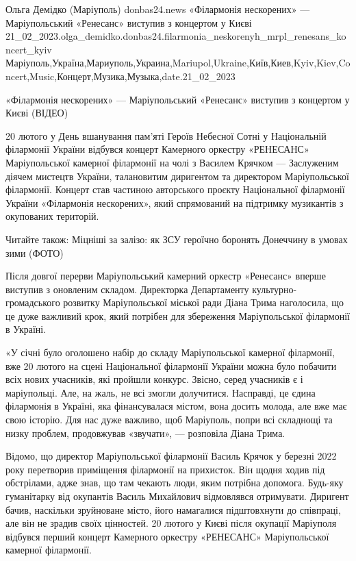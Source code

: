  
 
 
 
 

Ольга Демідко (Маріуполь)
donbas24.news
«Філармонія нескорених» — Маріупольський «Ренесанс» виступив з концертом у Києві
21_02_2023.olga_demidko.donbas24.filarmonia_neskorenyh_mrpl_renesans_koncert_kyiv
Маріуполь,Україна,Мариуполь,Украина,Mariupol,Ukraine,Київ,Киев,Kyiv,Kiev,Concert,Music,Концерт,Музика,Музыка,date.21_02_2023

«Філармонія нескорених» — Маріупольський «Ренесанс» виступив з концертом у Києві (ВІДЕО)

20 лютого у День вшанування пам’яті Героїв Небесної Сотні у Національній
філармонії України відбувся концерт Камерного оркестру «РЕНЕСАНС»
Маріупольської камерної філармонії на чолі з Василем Крячком — Заслуженим
діячем мистецтв України, талановитим диригентом та директором Маріупольської
філармонії. Концерт став частиною авторського проєкту Національної філармонії
України «Філармонія нескорених», який спрямований на підтримку музикантів з
окупованих територій.

Читайте також: Міцніші за залізо: як ЗСУ героїчно боронять Донеччину в умовах
зими (ФОТО)

Після довгої перерви Маріупольський камерний оркестр «Ренесанс» вперше виступив
з оновленим складом. Директорка Департаменту культурно-громадського розвитку
Маріупольської міської ради Діана Трима наголосила, що це дуже важливий крок,
який потрібен для збереження Маріупольської філармонії в Україні.

«У січні було оголошено набір до складу Маріупольської камерної філармонії, вже
20 лютого на сцені Національної філармонії України можна було побачити всіх
нових учасників, які пройшли конкурс. Звісно, серед учасників є і маріупольці.
Але, на жаль, не всі змогли долучитися. Насправді, це єдина філармонія в
Україні, яка фінансувалася містом, вона досить молода, але вже має свою
історію. Для нас дуже важливо, щоб Маріуполь, попри всі складнощі та низку
проблем, продовжував «звучати», — розповіла Діана Трима.

Відомо, що директор Маріупольської філармонії Василь Крячок у березні 2022 року
перетворив приміщення філармонії на прихисток. Він щодня ходив під обстрілами,
адже знав, що там чекають люди, яким потрібна допомога. Будь-яку гуманітарку
від окупантів Василь Михайлович відмовлявся отримувати. Диригент бачив,
наскільки зруйноване місто, його намагалися підштовхнути до співпраці, але він
не зрадив своїх цінностей. 20 лютого у Києві після окупації Маріуполя відбувся
перший концерт Камерного оркестру «РЕНЕСАНС» Маріупольської камерної
філармонії.


